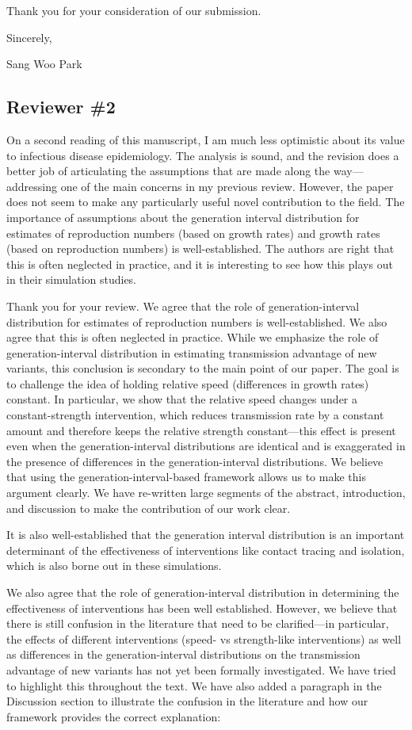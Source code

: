 \documentclass[12pt]{article}
\newcommand{\rev}{\subsection*}
\newcommand{\revtext}{\textsf}
\begin{document}
Thank you for your consideration of our submission.

Sincerely,

Sang Woo Park

\rev{Reviewer \#2}

\revtext{On a second reading of this manuscript, I am much less optimistic about its value to infectious disease epidemiology. The analysis is sound, and the revision does a better job of articulating the assumptions that are made along the way---addressing one of the main concerns in my previous review. However, the paper does not seem to make any particularly useful novel contribution to the field. The importance of assumptions about the generation interval distribution for estimates of reproduction numbers (based on growth rates) and growth rates (based on reproduction numbers) is well-established. The authors are right that this is often neglected in practice, and it is interesting to see how this plays out in their simulation studies.}

Thank you for your review.
We agree that the role of generation-interval distribution for estimates of reproduction numbers is well-established. We also agree that this is often neglected in practice. 
While we emphasize the role of generation-interval distribution in estimating transmission advantage of new variants, this conclusion is secondary to the main point of our paper. 
The goal is to challenge the idea of holding relative speed (differences in growth rates) constant.
In particular, we show that the relative speed changes under a constant-strength intervention, which reduces transmission rate by a constant amount and therefore keeps the relative strength constant---this effect is present even when the generation-interval distributions are identical and is exaggerated in the presence of differences in the generation-interval distributions.
We believe that using the generation-interval-based framework allows us to make this argument clearly.
We have re-written large segments of the abstract, introduction, and discussion to make the contribution of our work clear.

\revtext{It is also well-established that the generation interval distribution is an important determinant of the effectiveness of interventions like contact tracing and isolation, which is also borne out in these simulations.}

We also agree that the role of generation-interval distribution in determining the effectiveness of interventions has been well established.
However, we believe that there is still confusion in the literature that need to be clarified---in particular, the effects of different interventions (speed- vs strength-like interventions) as well as differences in the generation-interval distributions on the transmission advantage of new variants has not yet been formally investigated.
We have tried to highlight this throughout the text.
We have also added a paragraph in the Discussion section to illustrate the confusion in the literature and how our framework provides the correct explanation: 
\end{document}

